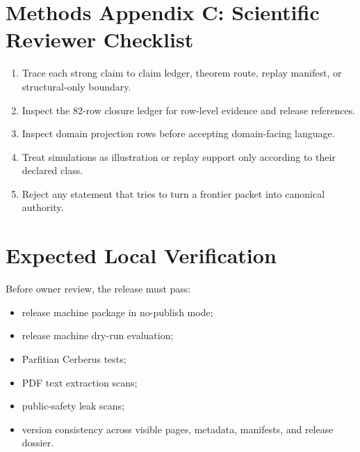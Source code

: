 \documentclass[11pt,a4paper]{article}
\begin{document}
\section*{Methods Appendix C: Scientific Reviewer Checklist}
\begin{enumerate}
  \item Trace each strong claim to claim ledger, theorem route, replay manifest, or structural-only boundary.
  \item Inspect the 82-row closure ledger for row-level evidence and release references.
  \item Inspect domain projection rows before accepting domain-facing language.
  \item Treat simulations as illustration or replay support only according to their declared class.
  \item Reject any statement that tries to turn a frontier packet into canonical authority.
\end{enumerate}

\section*{Expected Local Verification}
Before owner review, the release must pass:
\begin{itemize}
  \item release machine package in no-publish mode;
  \item release machine dry-run evaluation;
  \item Parfitian Cerberus tests;
  \item PDF text extraction scans;
  \item public-safety leak scans;
  \item version consistency across visible pages, metadata, manifests, and release dossier.
\end{itemize}
\end{document}
